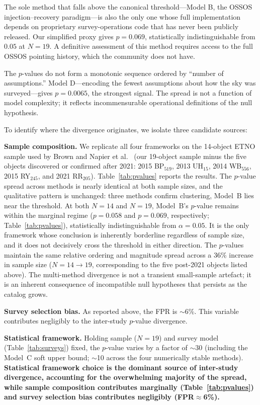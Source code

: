 \documentclass[12pt,a4paper]{article}
\begin{document}
The sole method that falls above the canonical threshold---Model B, the OSSOS injection--recovery paradigm---is also the only one whose full implementation depends on proprietary survey-operations code that has never been publicly released. Our simplified proxy gives $p=0.069$, statistically indistinguishable from $0.05$ at $N=19$. A definitive assessment of this method requires access to the full OSSOS pointing history, which the community does not have.

The $p$-values do not form a monotonic sequence ordered by ``number of assumptions.'' Model D---encoding the fewest assumptions about how the sky was surveyed---gives $p=0.0065$, the strongest signal. The spread is not a function of model complexity; it reflects incommensurable operational definitions of the null hypothesis.

To identify where the divergence originates, we isolate three candidate sources:

\textbf{Sample composition.} We replicate all four frameworks on the 14-object ETNO sample used by Brown \cite{brown2019} and Napier et al.\ \cite{napier2021} (our 19-object sample minus the five objects discovered or confirmed after 2021: 2015 BP$_{519}$, 2013 UH$_{15}$, 2014 WB$_{556}$, 2015 RY$_{245}$, and 2021 RR$_{205}$). Table~\ref{tab:pvalues} reports the results. The $p$-value spread across methods is nearly identical at both sample sizes, and the qualitative pattern is unchanged: three methods confirm clustering, Model~B lies near the threshold. At both $N=14$ and $N=19$, Model~B's $p$-value remains within the marginal regime ($p=0.058$ and $p=0.069$, respectively; Table~\ref{tab:pvalues}), statistically indistinguishable from $\alpha=0.05$. It is the only framework whose conclusion is inherently borderline regardless of sample size, and it does not decisively cross the threshold in either direction. The $p$-values maintain the same relative ordering and magnitude spread across a 36\% increase in sample size ($N=14 \to 19$, corresponding to the five post-2021 objects listed above). The multi-method divergence is not a transient small-sample artefact; it is an inherent consequence of incompatible null hypotheses that persists as the catalog grows.

\textbf{Survey selection bias.} As reported above, the FPR is $\sim$6\%. This variable contributes negligibly to the inter-study $p$-value divergence.

\textbf{Statistical framework.} Holding sample ($N=19$) and survey model (Table~\ref{tab:surveys}) fixed, the $p$-value varies by a factor of $\sim$30 (including the Model~C soft upper bound; $\sim$10 across the four numerically stable methods). \textbf{Statistical framework choice is the dominant source of inter-study divergence, accounting for the overwhelming majority of the spread, while sample composition contributes marginally (Table~\ref{tab:pvalues}) and survey selection bias contributes negligibly (FPR$\approx$6\%).}
\end{document}
